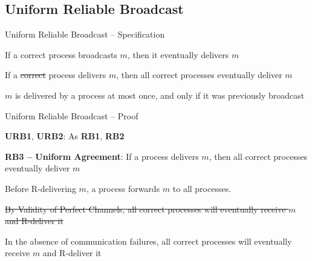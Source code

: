 \subsection{Uniform Reliable Broadcast}

\begin{frame}{Uniform Reliable Broadcast -- Specification}

\begin{definition}
If a correct process broadcasts $m$, then it eventually delivers $m$
\end{definition}

\begin{definition}
If a \sout{correct} process delivers $m$, then all correct processes eventually deliver $m$
\end{definition}

\begin{definition}
$m$ is delivered by a process at most once, and only if 
it was previously broadcast
\end{definition}

\end{frame}

\begin{frame}{Uniform Reliable Broadcast -- Proof}





\BIL
\item \textbf{URB1}, \textbf{URB2}: As \textbf{RB1}, \textbf{RB2}
\item \textbf{RB3 -- Uniform Agreement}: If a process delivers $m$, then all correct processes eventually deliver $m$
\BI
\item Before R-delivering $m$, a process forwards $m$ to all processes. 
\item \sout{By Validity of Perfect Channels, all correct processes will eventually receive $m$ and R-deliver it}
\item In the \alert{absence of communication failures}, all correct processes will eventually receive $m$ and R-deliver it
\EI
\EIL

\end{frame}


